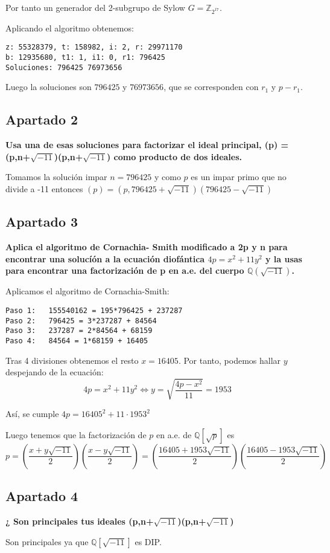 \documentclass[a4paper]{article}
\begin{document}
Por tanto un generador del 2-subgrupo de Sylow $G=\mathbb{Z}_{2^{17}}$.

Aplicando el algoritmo obtenemos:

\begin{verbatim}
z: 55328379, t: 158982, i: 2, r: 29971170
b: 12935680, t1: 1, i1: 0, r1: 796425
Soluciones: 796425 76973656
\end{verbatim}

Luego la soluciones son $796425$ y $76973656$, que se corresponden con $r_1$ y $p-r_1$.

\subsection{Apartado 2}
\textbf{Usa una de esas soluciones para factorizar el ideal principal, (p) =(p,n+$\sqrt{-11}$)(p,n+$\sqrt{-11}$) como producto de dos ideales.}

Tomamos la solución impar $n=796425$ y como $p$ es un impar primo que no divide a -11 entonces $(p)=\left(p, 796425+\sqrt{-11}\right)\left(796425-\sqrt{-11}\right)$

\subsection{Apartado 3}
\textbf{Aplica el algoritmo de Cornachia- Smith modificado a 2p y n para encontrar una solucíón a la ecuación diofántica $4p =x^2 + 11y^2$ y la usas para encontrar una factorización de p en a.e. del cuerpo $\mathbb{Q}(\sqrt{-11})$.}

Aplicamos el algoritmo de Cornachia-Smith:

\begin{verbatim}
Paso 1:   155540162 = 195*796425 + 237287
Paso 2:   796425 = 3*237287 + 84564
Paso 3:   237287 = 2*84564 + 68159
Paso 4:   84564 = 1*68159 + 16405
\end{verbatim}

Tras 4 divisiones obtenemos el resto $x=16405$. Por tanto, podemos hallar $y$ despejando de la ecuación:
$$4p =x^2 + 11y^2  \Leftrightarrow y = \sqrt{\frac{4p-x^2}{11}}=1953$$

Así, se cumple  $4p = 16405^2+11\cdot 1953^2$

Luego tenemos que la factorización de $p$ en a.e. de $\mathbb{Q}[\sqrt{p}]$ es
$$p= \left( \frac{x+y\sqrt{-11}}{2}\right) \left( \frac{x-y\sqrt{-11}}{2}\right) = \left( \frac{16405+1953\sqrt{-11}}{2}\right) \left( \frac{16405-1953\sqrt{-11}}{2}\right)$$


\subsection{Apartado 4}
\textbf{¿ Son principales tus ideales (p,n+$\sqrt{-11}$)(p,n+$\sqrt{-11}$)}

Son principales ya que $\mathbb{Q}[\sqrt{-11}]$ es DIP.
\end{document}
